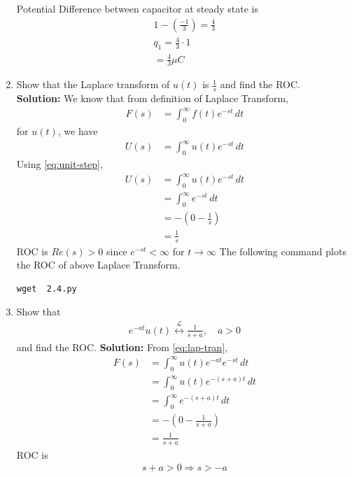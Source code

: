 \documentclass[journal,12pt,twocolumn]{IEEEtran}
\newcommand{\solution}{\noindent \textbf{Solution: }}
\providecommand{\brak}[1]{\ensuremath{\left(#1\right)}}
\providecommand{\system}[1]{\overset{\mathcal{#1}}{ \longleftrightarrow}}
\numberwithin{equation}{section}
\renewcommand\thesection{\arabic{section}}
\begin{document}
\begin{enumerate}[label=\arabic*.,ref=\thesection.\theenumi]
Potential Difference between capacitor at steady state is
\begin{align}
1-\brak{\frac{-1}{3}}=\frac{4}{3}\\
q_1=\frac{4}{3} \cdot 1\\
=\frac{4}{3} \mu C
\end{align}
	\item Show that the Laplace transform of $u(t)$ is $\frac{1}{s}$ and find the ROC.\\
	\solution We know that from definition of Laplace Transform,
	\begin{align}
	\label{eq:lap-tran}
	F(s)&= \int_{0}^{\infty} f(t)e^{-st} \,dt 
	\end{align}
	for $u(t)$, we have
	\begin{align}
		U(s)&=\int_{0}^{\infty} u(t)e^{-st} \,dt
	\end{align}
	Using \eqref{eq:unit-step},
	\begin{align}
	U(s)&=\int_{0}^{\infty} u(t)e^{-st} \,dt\\
	&=\int_{0}^{\infty} e^{-st} \,dt\\
	&=-\brak{0-\frac{1}{s}}\\
	&=\frac{1}{s}
	\end{align}
	ROC is $ Re(s)>0$ since $e^{-st}<\infty$ for $t \to \infty$
	The following command plots the ROC of above Laplace Transform.
	\begin{lstlisting}
wget  2.4.py	
\end{lstlisting}
	\begin{figure}[!ht]
			\centering
			\caption{}
			\label{fig:roc1}
\end{figure}
	\item Show that 
		\begin{align}
			e^{-at}u(t) \system{L} \frac{1}{s+a}, \quad a > 0
		\end{align}
		and find the ROC.
		\solution From \eqref{eq:lap-tran},
		\begin{align}
		F(s)&=\int_{0}^{\infty} u(t)e^{-at}e^{-st} \,dt\\
		&=\int_{0}^{\infty} u(t)e^{-\brak{s+a}t} \,dt\\
		&=\int_{0}^{\infty} e^{-\brak{s+a}t} \,dt\\
		&=-\brak{0-\frac{1}{s+a}}\\
		&=\frac{1}{s+a}
		\end{align}
		ROC is
		\begin{align}
		s+a>0 \Rightarrow s>-a
		\end{align}

\end{enumerate}
\end{document}
